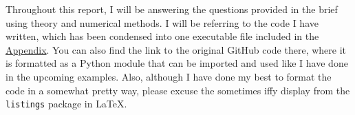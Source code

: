 \documentclass[../main.tex]{subfiles}
\begin{document}
    Throughout this report, I will be answering the questions provided in the brief using theory and numerical methods.
    I will be referring to the code I have written, which has been condensed into one executable file included in
    the \hyperref[ch:appendix]{Appendix}.
    You can also find the link to the original GitHub code there, where it is formatted as
    a Python module that can be imported and used like I have done in the upcoming examples.
    Also, although I have done my best to format the code in a somewhat pretty way, please excuse
    the sometimes iffy display from the \texttt{listings} package in \LaTeX.
\end{document}

